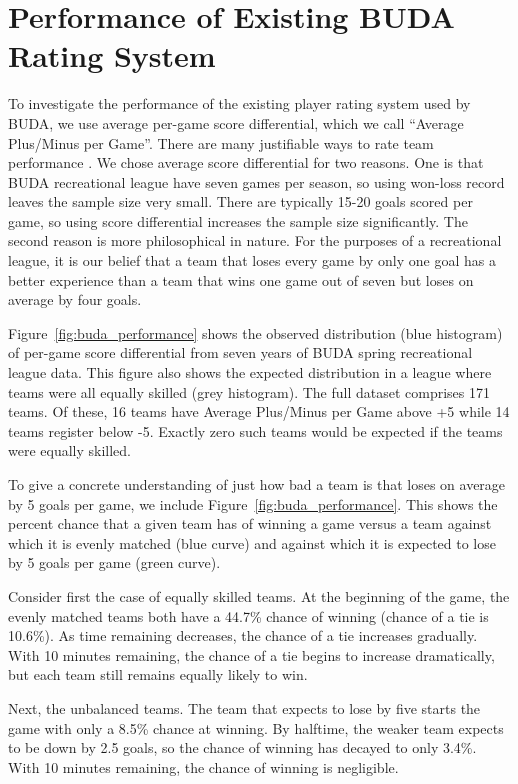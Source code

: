 \section{Performance of Existing BUDA Rating System}\label{sec:existing_performance}

To investigate the performance of the existing player rating system used by BUDA, we use average per-game score differential, which we call ``Average Plus/Minus per Game''. There are many justifiable ways to rate team performance \cite{Langville_2012}.  We chose average score differential for two reasons.  One is that BUDA recreational league have seven games per season, so using won-loss record leaves the sample size very small.  There are typically 15-20 goals scored per game, so using score differential increases the sample size significantly.  The second reason is more philosophical in nature.  For the purposes of a recreational league, it is our belief that a team that loses every game by only one goal has a better experience than a team that wins one game out of seven but loses on average by four goals.  

Figure~\ref{fig:buda_performance} shows the observed distribution (blue histogram) of per-game score differential from seven years of BUDA spring recreational league data.  This figure also shows the expected distribution in a league where teams were all equally skilled (grey histogram). The full dataset comprises 171 teams.  Of these, 16 teams have Average Plus/Minus per Game above +5 while 14 teams register below -5.  Exactly zero such teams would be expected if the teams were equally skilled.

To give a concrete understanding of just how bad a team is that loses on average by 5 goals per game, we include Figure~\ref{fig:buda_performance}.  This shows the percent chance that a given team has of winning a game versus a team against which it is evenly matched (blue curve) and against which it is expected to lose by 5 goals per game (green curve). 

Consider first the case of equally skilled teams.  At the beginning of the game, the evenly matched teams both have a 44.7\% chance of winning (chance of a tie is 10.6\%). As time remaining decreases, the chance of a tie increases gradually. With 10 minutes remaining, the chance of a tie begins to increase dramatically, but each team still remains equally likely to win.

Next, the unbalanced teams.  The team that expects to lose by five starts the game with only a 8.5\% chance at winning.  By halftime, the weaker team expects to be down by 2.5 goals, so the chance of winning has decayed to only 3.4\%.  With 10 minutes remaining, the chance of winning is negligible.